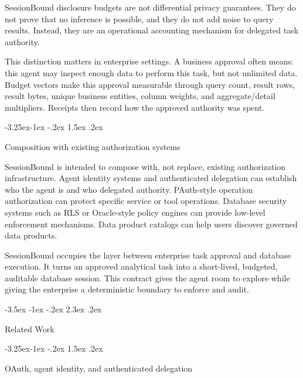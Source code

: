\documentclass[10pt,twocolumn]{article}
\makeatletter
\renewcommand\section{\@startsection{section}{1}{\z@}%
  {-3.5ex \@plus -1ex \@minus -.2ex}%
  {2.3ex \@plus .2ex}%
  {\normalfont\Large\bfseries\raggedright}}
\renewcommand\subsection{\@startsection{subsection}{2}{\z@}%
  {-3.25ex\@plus -1ex \@minus -.2ex}%
  {1.5ex \@plus .2ex}%
  {\normalfont\large\bfseries\raggedright}}
\makeatother
\begin{document}
SessionBound disclosure budgets are not differential privacy guarantees.
They do not prove that no inference is possible, and they do not add
noise to query results. Instead, they are an operational accounting
mechanism for delegated task authority.

This distinction matters in enterprise settings. A business approval
often means: this agent may inspect enough data to perform this task,
but not unlimited data. Budget vectors make this approval measurable
through query count, result rows, result bytes, unique business
entities, column weights, and aggregate/detail multipliers. Receipts then
record how the approved authority was spent.

\hypertarget{composition-with-existing-authorization-systems}{%
\subsection{Composition with existing authorization
systems}\label{composition-with-existing-authorization-systems}}

SessionBound is intended to compose with, not replace, existing
authorization infrastructure. Agent identity systems and authenticated
delegation can establish who the agent is and who delegated authority.
PAuth-style operation authorization can protect specific service or tool
operations. Database security systems such as RLS or Oracle-style policy
engines can provide low-level enforcement mechanisms. Data product
catalogs can help users discover governed data products.

SessionBound occupies the layer between enterprise task approval and
database execution. It turns an approved analytical task into a
short-lived, budgeted, auditable database session. This contract gives
the agent room to explore while giving the enterprise a deterministic
boundary to enforce and audit.


\hypertarget{related-work}{%
\section{Related Work}\label{related-work}}

\hypertarget{oauth-agent-identity-and-authenticated-delegation}{%
\subsection{OAuth, agent identity, and authenticated
delegation}\label{oauth-agent-identity-and-authenticated-delegation}}
\end{document}
